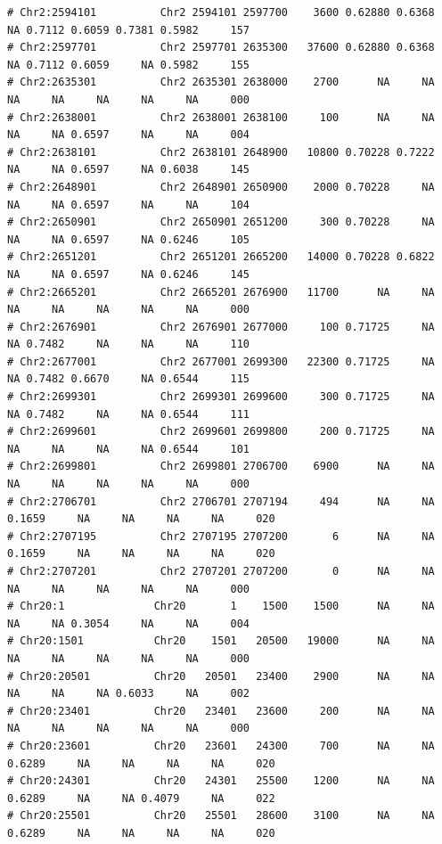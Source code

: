 \documentclass{article}\usepackage[]{graphicx}\usepackage[]{color}
\makeatletter
\newenvironment{kframe}{%
 \def\at@end@of@kframe{}%
 \ifinner\ifhmode%
  \def\at@end@of@kframe{\end{minipage}}%
  \begin{minipage}{\columnwidth}%
 \fi\fi%
 \def\FrameCommand##1{\hskip\@totalleftmargin \hskip-\fboxsep
 \colorbox{shadecolor}{##1}\hskip-\fboxsep
     \hskip-\linewidth \hskip-\@totalleftmargin \hskip\columnwidth}%
 \MakeFramed {\advance\hsize-\width
   \@totalleftmargin\z@ \linewidth\hsize
   \@setminipage}}%
 {\par\unskip\endMakeFramed%
 \at@end@of@kframe}
\newenvironment{knitrout}{}{} %
\makeatother
\begin{document}
\begin{knitrout}
\begin{kframe}
\begin{verbatim}
# Chr2:2594101          Chr2 2594101 2597700    3600 0.62880 0.6368     NA 0.7112 0.6059 0.7381 0.5982     157
# Chr2:2597701          Chr2 2597701 2635300   37600 0.62880 0.6368     NA 0.7112 0.6059     NA 0.5982     155
# Chr2:2635301          Chr2 2635301 2638000    2700      NA     NA     NA     NA     NA     NA     NA     000
# Chr2:2638001          Chr2 2638001 2638100     100      NA     NA     NA     NA 0.6597     NA     NA     004
# Chr2:2638101          Chr2 2638101 2648900   10800 0.70228 0.7222     NA     NA 0.6597     NA 0.6038     145
# Chr2:2648901          Chr2 2648901 2650900    2000 0.70228     NA     NA     NA 0.6597     NA     NA     104
# Chr2:2650901          Chr2 2650901 2651200     300 0.70228     NA     NA     NA 0.6597     NA 0.6246     105
# Chr2:2651201          Chr2 2651201 2665200   14000 0.70228 0.6822     NA     NA 0.6597     NA 0.6246     145
# Chr2:2665201          Chr2 2665201 2676900   11700      NA     NA     NA     NA     NA     NA     NA     000
# Chr2:2676901          Chr2 2676901 2677000     100 0.71725     NA     NA 0.7482     NA     NA     NA     110
# Chr2:2677001          Chr2 2677001 2699300   22300 0.71725     NA     NA 0.7482 0.6670     NA 0.6544     115
# Chr2:2699301          Chr2 2699301 2699600     300 0.71725     NA     NA 0.7482     NA     NA 0.6544     111
# Chr2:2699601          Chr2 2699601 2699800     200 0.71725     NA     NA     NA     NA     NA 0.6544     101
# Chr2:2699801          Chr2 2699801 2706700    6900      NA     NA     NA     NA     NA     NA     NA     000
# Chr2:2706701          Chr2 2706701 2707194     494      NA     NA 0.1659     NA     NA     NA     NA     020
# Chr2:2707195          Chr2 2707195 2707200       6      NA     NA 0.1659     NA     NA     NA     NA     020
# Chr2:2707201          Chr2 2707201 2707200       0      NA     NA     NA     NA     NA     NA     NA     000
# Chr20:1              Chr20       1    1500    1500      NA     NA     NA     NA 0.3054     NA     NA     004
# Chr20:1501           Chr20    1501   20500   19000      NA     NA     NA     NA     NA     NA     NA     000
# Chr20:20501          Chr20   20501   23400    2900      NA     NA     NA     NA     NA 0.6033     NA     002
# Chr20:23401          Chr20   23401   23600     200      NA     NA     NA     NA     NA     NA     NA     000
# Chr20:23601          Chr20   23601   24300     700      NA     NA 0.6289     NA     NA     NA     NA     020
# Chr20:24301          Chr20   24301   25500    1200      NA     NA 0.6289     NA     NA 0.4079     NA     022
# Chr20:25501          Chr20   25501   28600    3100      NA     NA 0.6289     NA     NA     NA     NA     020

\end{verbatim}
\end{kframe}
\end{knitrout}
\end{document}
